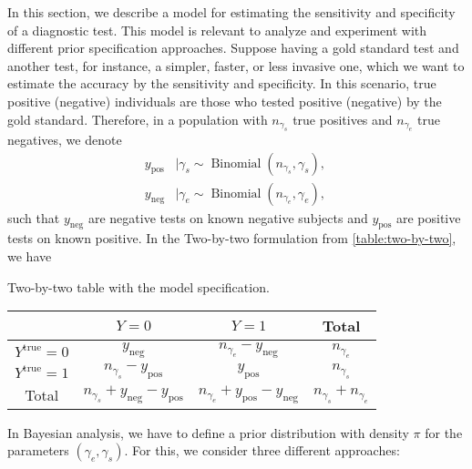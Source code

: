 In this section, we describe a model for estimating the sensitivity and
specificity of a diagnostic test. This model is relevant to analyze and
experiment with different prior specification approaches. Suppose having a
gold standard test and another test, for instance, a simpler, faster, or less
invasive one, which we want to estimate the accuracy by the sensitivity and
specificity. In this scenario,
true positive (negative) individuals are those who tested positive (negative) by
the gold standard. Therefore, in a population with $n_{\gamma_s}$ true
positives and  $n_{\gamma_e}$ true negatives, we denote 
\begin{equation}
  \label{model:sensitivity-specificity}
  \begin{aligned}
    y_{\mathrm{pos}} &\mid \gamma_s \sim \operatorname{Binomial}(n_{\gamma_s}, \gamma_s),\ \\
    y_{\mathrm{neg}} &\mid \gamma_e \sim \operatorname{Binomial}(n_{\gamma_e}, \gamma_e), 
  \end{aligned}
\end{equation}
such that $y_{\mathrm{neg}}$ are negative tests on known negative 
subjects and $y_{\mathrm{pos}}$ are positive tests on
known positive. In the Two-by-two formulation from \autoref{table:two-by-two},
we have

\begin{quadro}[!ht]
  \centering
  \caption{\label{table:two-by-two-data}Two-by-two table with the model specification.}
  \begin{tabular}{c|c|c|c|}
  \cline{2-4}
                                               & $Y = 0$ & $Y = 1$ & Total\\ \hline
  \multicolumn{1}{|c|}{$Y^{\mathrm{true}}= 0$} & $y_{\mathrm{neg}}$  & $n_{\gamma_e} - y_{\mathrm{neg}}$ & $n_{\gamma_e}$ \\ \hline
  \multicolumn{1}{|c|}{$Y^{\mathrm{true}}= 1$} & $n_{\gamma_s} -
  y_{\mathrm{pos}}$    & $y_{\mathrm{pos}}$  & $n_{\gamma_s}$  \\ \hline
  \multicolumn{1}{|c|}{Total} & $n_{\gamma_s} + y_{\mathrm{neg}} -
  y_{\mathrm{pos}}$ & $n_{\gamma_e} + y_{\mathrm{pos}} - y_{\mathrm{neg}}$ &
  $n_{\gamma_s} + n_{\gamma_e}$ \\\hline
  \end{tabular}
\end{quadro}

In Bayesian analysis, we have to define a prior distribution with density $\pi$ for the
parameters $(\gamma_e, \gamma_s)$. For this, we consider three different approaches: 

